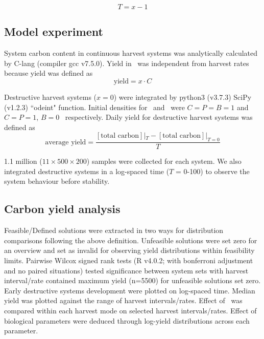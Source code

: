 \documentclass[../thesis.tex]{subfiles} %
\begin{document}
\begin{equation}
    T = x-1
    \label{eq:TvsX}
\end{equation}

\subsection{Model experiment}
System carbon content in continuous harvest systems was analytically calculated by C-lang (compiler gcc v7.5.0). Yield in \PoH\ was independent from harvest rates because yield was defined as
\begin{equation}
    \text{yield} = x\cdot C
    \label{eq:yield}
\end{equation}

Destructive harvest systems ($x=0$) were integrated by python3 (v3.7.3) SciPy (v1.2.3) ``odeint" function.  Initial densities for \PBN\ and \PoN\ were $C=P=B=1$ and $C=P=1$, $B=0$ \den\ respectively.  Daily yield for destructive harvest systems was defined as
\begin{equation}
    \text{average yield} = \dfrac{[\text{total carbon}]|_{T}-[\text{total carbon}]|_{T=0}}{T}
    \label{eq:avgYd}
\end{equation}

1.1 million ($11\times500\times200$) samples were collected for each system.  We also integrated destructive systems in a log-spaced time ($T$ = 0-100) to observe the system behaviour before stability.

\subsection{Carbon yield analysis}
Feasible/Defined solutions were extracted in two ways for distribution comparisons following the above definition.  Unfeasible solutions were set zero for an overview and set as invalid for observing yield distributions within feasibility limits.  Pairwise Wilcox signed rank tests (R v4.0.2; with bonferroni adjustment and no paired situations) tested significance between system sets with harvest interval/rate contained maximum yield (n=5500) for unfeasible solutions set zero.  Early destructive systems development were plotted on log-spaced time.  Median yield was plotted against the range of harvest intervals/rates.  Effect of \bac\ was compared within each harvest mode on selected harvest intervals/rates.  Effect of biological parameters were deduced through log-yield distributions across each parameter.
\end{document}
